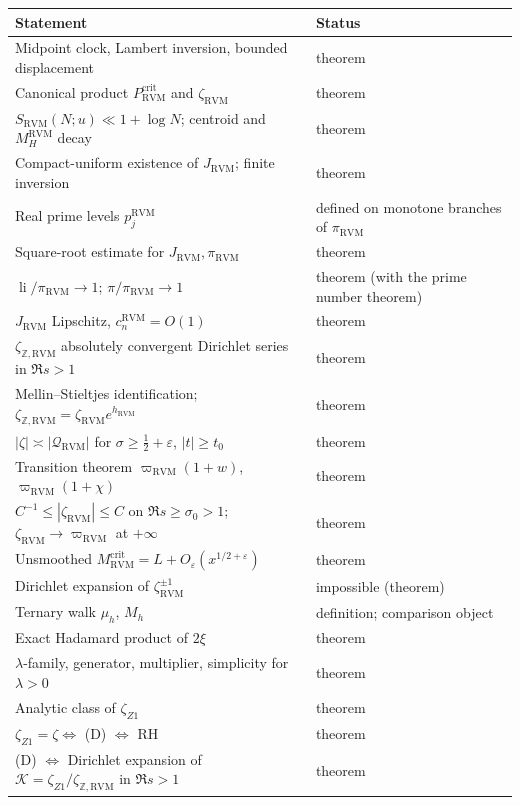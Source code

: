 \documentclass[11pt,reqno]{amsart}
\numberwithin{equation}{section}
\theoremstyle{plain}
\theoremstyle{definition}
\theoremstyle{remark}
\newcommand{\Z}{\mathbb Z}
\newcommand{\eps}{\varepsilon}
\newcommand{\li}{\operatorname{li}}
\newcommand{\RVM}{\mathrm{RVM}}
\newcommand{\crit}{\mathrm{crit}}
\begin{document}
\begin{center}
\small
\begin{tabular}{p{}p{}}
\toprule
Statement & Status\\
\midrule
Midpoint clock, Lambert inversion, bounded displacement & theorem\\
Canonical product $P_{\RVM}^{\crit}$ and $\zeta_{\RVM}$ & theorem\\
$S_{\RVM}(N;u)\ll1+\log N$; centroid and $M_H^{\RVM}$ decay & theorem\\
Compact-uniform existence of $J_{\RVM}$; finite inversion & theorem\\
Real prime levels $p_j^{\RVM}$ & defined on monotone branches of $\pi_{\RVM}$\\
Square-root estimate for $J_{\RVM},\pi_{\RVM}$ & theorem\\
$\li/\pi_{\RVM}\to1$; $\pi/\pi_{\RVM}\to1$ & theorem (with the prime number theorem)\\
$J_{\RVM}$ Lipschitz, $c_n^{\RVM}=O(1)$ & theorem\\
$\zeta_{\Z,\RVM}$ absolutely convergent Dirichlet series in $\Re s>1$ & theorem\\
Mellin--Stieltjes identification; $\zeta_{\Z,\RVM}=\zeta_{\RVM}e^{h_{\RVM}}$ & theorem\\
$|\zeta|\asymp|\mathcal Q_{\RVM}|$ for $\sigma\ge\frac12+\eps$, $|t|\ge t_0$ & theorem\\
Transition theorem $\varpi_{\RVM}(1+w)$, $\varpi_{\RVM}(1+\chi)$ & theorem\\
$C^{-1}\le|\zeta_{\RVM}|\le C$ on $\Re s\ge\sigma_0>1$; $\zeta_{\RVM}\to\varpi_{\RVM}$ at $+\infty$ & theorem\\
Unsmoothed $M_{\RVM}^{\crit}=L+O_\eps(x^{1/2+\eps})$ & theorem\\
Dirichlet expansion of $\zeta_{\RVM}^{\pm1}$ & impossible (theorem)\\
Ternary walk $\mu_h$, $M_h$ & definition; comparison object\\
Exact Hadamard product of $2\xi$ & theorem\\
$\lambda$-family, generator, multiplier, simplicity for $\lambda>0$ & theorem\\
Analytic class of $\zeta_{Z1}$ & theorem\\
$\zeta_{Z1}=\zeta\Leftrightarrow$ (D) $\Leftrightarrow$ RH & theorem\\
(D) $\Leftrightarrow$ Dirichlet expansion of $\mathcal K=\zeta_{Z1}/\zeta_{\Z,\RVM}$ in $\Re s>1$ & theorem\\

\end{tabular}
\end{center}
\end{document}
